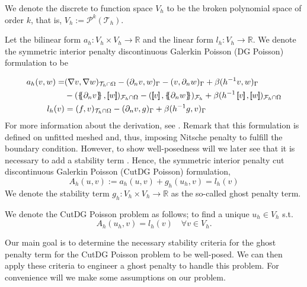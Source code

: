 
We denote the discrete to function space $V_{h}$ to be the broken polynomial space of order $k$, that is, $V_{h} := \mathcal{P}^{k}( \mathcal{T}_{h} )  $.


Let the bilinear form $a_{h}: V_{h} \times V_{h} \to \mathbb{R} $  and the linear form $l_{h}: V_{h} \to \mathbb{R} $. We denote the symmetric interior penalty discontinuous Galerkin Poisson (DG Poisson)  formulation to be

\begin{equation}
\label{eq:poisson_DG}
\begin{split}
    a_{h}( v,w)  = &( \nabla v, \nabla w)_{\mathcal{T} _{h} \cap \Omega } - ( \partial _{n} v,w)_{\Gamma } - ( v, \partial _{n} w)_{\Gamma } + \beta ( h^{-1} v,w)_{\Gamma } \\
    & - ( \mean{ \partial _{n} v }  , \jump{ w }  ) _{\mathcal{F} _{h} \cap \Omega } - ( \jump{ v }  , \mean{ \partial _{n} w }  )_{\mathcal{F} _{h}} + \beta ( h^{-1} \jump{ v }  , \jump{ w }  )_{\mathcal{F}_{h}\cap \Omega  } \\
    l_{h}( v)  &=  ( f,v) _{\mathcal{T} _{h} \cap \Omega } - ( \partial _{n} v,g) _{\Gamma } + \beta ( h^{-1} g,v)_{\Gamma }
\end{split}
\end{equation}
For more information about the derivation, see \cite[Chapter 4.2]{pietro2012}. Remark that this formulation is defined on unfitted meshed and, thus, imposing Nitsche penalty to fulfill the boundary condition.
However, to show well-posedness will we later see that it is necessary to add a stability term . Hence, the symmetric interior penalty cut discontinuous Galerkin Poisson (CutDG Poisson) formulation,
\[
A_{h}( u, v) := a_{h}( u, v) + g_{h}( u_{h}, v) = l_{h}(v)
\]
We denote the stability term $g_{h}: V_{h} \times V_{h} \to \mathbb{R} $ as the so-called ghost penalty term.

\begin{definition}
    \label{def:cutdg_poisson_problem}

We denote the CutDG Poisson problem as follows; to find a unique $u_{h} \in V_{h}$ s.t.  \[
A_{h}(u_{h}, v ) = l_{h}( v)  \quad \forall  v \in V_{h}.
\]
\end{definition}

Our main goal is to determine the necessary stability criteria for the ghost penalty term for the CutDG Poisson problem to be well-posed. We can then apply these criteria to engineer a ghost penalty to handle this problem. For convenience will we make some assumptions on our problem.


